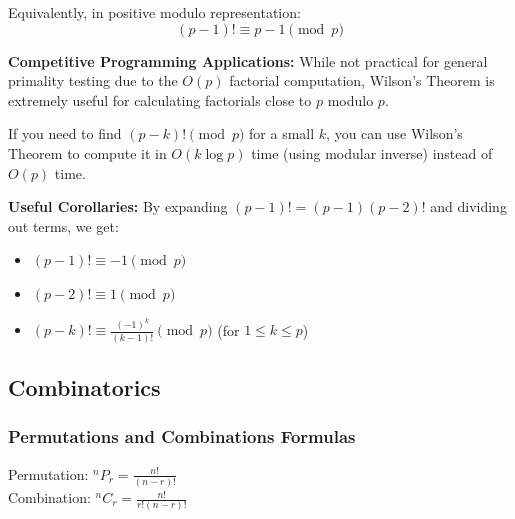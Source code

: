 Equivalently, in positive modulo representation:
$$(p - 1)! \equiv p - 1 \pmod{p}$$

\textbf{Competitive Programming Applications:}
While not practical for general primality testing due to the $O(p)$ factorial computation, Wilson's Theorem is extremely useful for calculating factorials close to $p$ modulo $p$. 

If you need to find $(p-k)! \pmod{p}$ for a small $k$, you can use Wilson's Theorem to compute it in $O(k \log p)$ time (using modular inverse) instead of $O(p)$ time.

\textbf{Useful Corollaries:}
By expanding $(p-1)! = (p-1)(p-2)!$ and dividing out terms, we get:
\begin{itemize}
  \item $(p - 1)! \equiv -1 \pmod{p}$
  \item $(p - 2)! \equiv 1 \pmod{p}$
  \item $(p - k)! \equiv \frac{(-1)^k}{(k-1)!} \pmod{p}$ \quad (for $1 \le k \le p$)
\end{itemize}

\subsection{Combinatorics}
\subsubsection{Permutations and Combinations Formulas}
Permutation: ${}^n P_r = \frac{n!}{(n-r)!}$ \\
Combination: ${}^n C_r = \frac{n!}{r!(n-r)!}$

